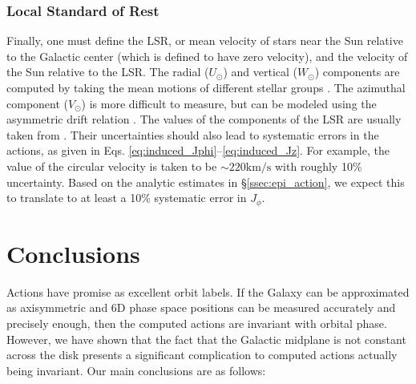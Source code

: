 \documentclass[twocolumn]{aastex62}
\newcommand{\kms}{\text{km}/\text{s}}
\begin{document}
\subsubsection{Local Standard of Rest}
Finally, one must define the LSR, or mean velocity of stars near the Sun
relative to the Galactic center (which is defined to have zero velocity), and
the velocity of the Sun relative to the LSR. The radial ($U_{\odot}$) and
vertical ($W_{\odot}$) components are computed by taking the mean motions of
different stellar groups \citep[e.g.][]{2012MNRAS.427..274S}. The azimuthal
component ($V_{\odot}$) is more difficult to measure, but can be modeled using
the asymmetric drift relation \citep{2008gady.book.....B}. The values of the
components of the LSR are usually taken from \citet{2010MNRAS.403.1829S}. Their uncertainties should also lead to systematic errors in the actions, as given in Eqs. \ref{eq:induced_Jphi}--\ref{eq:induced_Jz}. For example, the
value of the circular velocity is taken to be $\sim 220\kms$
\citep[e.g.][]{2012ApJ...759..131B} with roughly 10\% uncertainty. Based on the analytic estimates in \S \ref{ssec:epi_action}, we expect this to translate to at least a 10\% systematic error in $J_{\phi}$.

\vspace{6pt}



\section{Conclusions}\label{sec:conclusion}
Actions have promise as excellent orbit labels. If the Galaxy can be
approximated as axisymmetric and 6D phase space positions can be measured
accurately and precisely enough, then the computed actions are invariant with
orbital phase. However, we have shown that the fact that the Galactic midplane
is not constant across the disk presents a significant complication to
computed actions actually being invariant. Our main conclusions are as
follows:
\end{document}
